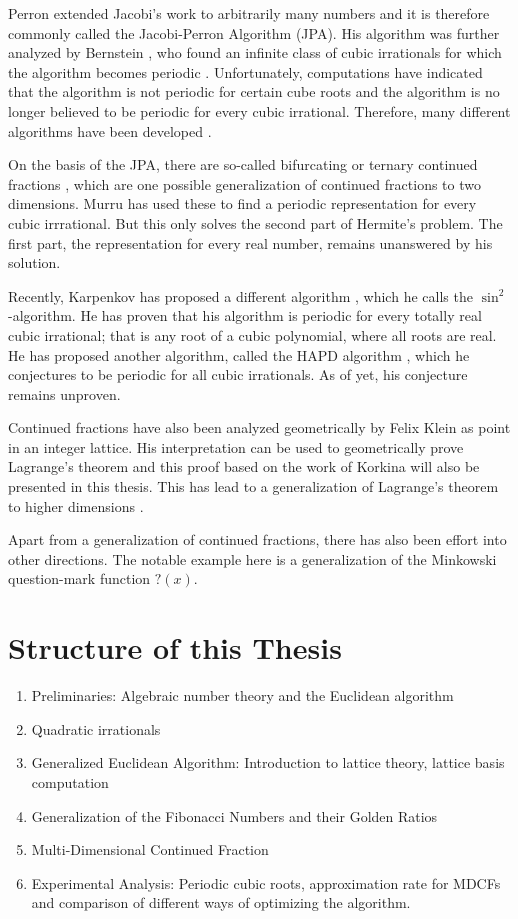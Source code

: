Perron extended Jacobi's work to arbitrarily many numbers \cite{Perron07}
and it is therefore commonly called the Jacobi-Perron Algorithm (JPA).
His algorithm was further analyzed by Bernstein \cite{Bernstein71},
who found an infinite class of cubic irrationals for which the algorithm
becomes periodic \cite{Bernstein65, Bernstein64A, Bernstein64B}.
Unfortunately, computations have indicated that the algorithm is not periodic
for certain cube roots \cite{Elsner67}
and the algorithm is no longer believed to be periodic for every cubic irrational.
Therefore, many different algorithms have been developed \cite{Schweiger00,Hendy81,Schweiger13}.

On the basis of the JPA,
there are so-called bifurcating or ternary continued fractions \cite{Gupta00},
which are one possible generalization of continued fractions to two dimensions.
Murru has used these to find a periodic representation for every cubic irrrational.
But this only solves the second part of Hermite's problem.
The first part, the representation for every real number, remains unanswered by his solution.

Recently, Karpenkov has proposed a different algorithm \cite{Karpenkov21}, which he calls the $\sin^2$-algorithm.
He has proven that his algorithm is periodic for every totally real cubic
irrational; that is any root of a cubic polynomial, where all roots are real.
He has proposed another algorithm, called the HAPD algorithm \cite{Karpenkov24}, which he
conjectures to be periodic for all cubic irrationals.
As of yet, his conjecture remains unproven.

Continued fractions have also been analyzed geometrically by Felix Klein \cite{Klein95}
as point in an integer lattice.
His interpretation can be used to geometrically prove Lagrange's theorem
and this proof based on the work of Korkina \cite{Korkina96} will also be
presented in this thesis.
This has lead to a generalization of Lagrange's theorem to higher dimensions \cite{German08}.

Apart from a generalization of continued fractions,
there has also been effort into other directions.
The notable example here is a generalization of the Minkowski question-mark function $?(x)$.

\section{Structure of this Thesis}

\begin{enumerate}
  \item Preliminaries: Algebraic number theory and the Euclidean algorithm
  \item Quadratic irrationals
  \item Generalized Euclidean Algorithm: Introduction to lattice theory, lattice basis computation
  \item Generalization of the Fibonacci Numbers and their Golden Ratios
  \item Multi-Dimensional Continued Fraction
  \item Experimental Analysis: Periodic cubic roots, approximation rate for
    MDCFs and comparison of different ways of optimizing the algorithm.
\end{enumerate}
